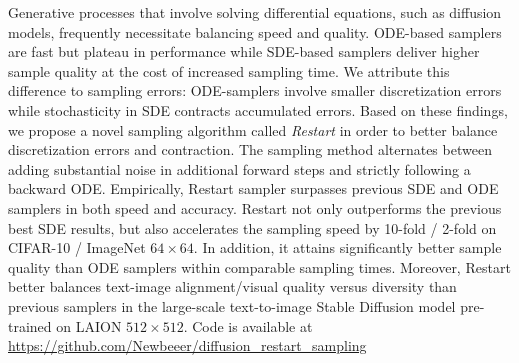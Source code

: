 
Generative processes that involve solving differential equations, such as diffusion models, frequently necessitate balancing speed and quality. ODE-based samplers are fast but plateau in performance while SDE-based samplers deliver higher sample quality at the cost of increased sampling time.  We attribute this difference to sampling errors: ODE-samplers involve smaller discretization errors while stochasticity in SDE contracts accumulated errors. Based on these findings, we propose a novel sampling algorithm called \textit{Restart} in order to better balance discretization errors and contraction. The sampling method alternates between adding substantial noise in additional forward steps and strictly following a backward ODE. Empirically, Restart sampler surpasses previous SDE and ODE samplers in both speed and accuracy. Restart not only outperforms the previous best SDE results, but also accelerates the sampling speed by 10-fold / 2-fold on CIFAR-10 / ImageNet $64{\times} 64$. In addition, it attains significantly better sample quality than ODE samplers within comparable sampling times. Moreover, Restart better balances text-image alignment/visual quality versus diversity than previous samplers in the large-scale text-to-image Stable Diffusion model pre-trained on LAION $512{\times} 512$.  Code is available at \url{https://github.com/Newbeeer/diffusion_restart_sampling}

